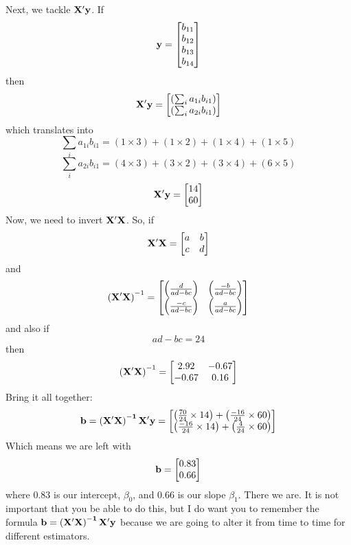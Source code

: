 Next, we tackle ${\bf X'y}$. If
\[
{\bf y} =
\begin{bmatrix}
b_{11} \\
b_{12} \\
b_{13} \\
b_{14} \\
\end{bmatrix}
\]
then
\begin{equation}
{\bf X'y} =
\begin{bmatrix}
\left(\sum_ia_{1i}b_{i1}\right) \\
\left(\sum_ia_{2i}b_{i1}\right) \\
\end{bmatrix}
\end{equation}
which translates into
\[
\sum_ia_{1i}b_{i1} = \left(1\times3\right)+\left(1\times2\right)+\left(1\times4\right)+\left(1\times5\right)
\]
\[
\sum_ia_{2i}b_{i1} = \left(4\times3\right)+\left(3\times2\right)+\left(3\times4\right)+\left(6\times5\right)
\]
\[
{\bf X'y} =
\begin{bmatrix}
14 \\
60 \\
\end{bmatrix}
\]
Now, we need to invert $\bf X'X$. So, if
\[
{\bf X'X} =
\begin{bmatrix}
a&b \\
c&d \\
\end{bmatrix}
\]
and
\begin{equation}
\left({\bf X'X}\right)^{-1} =
\begin{bmatrix}
\left(\frac{d}{ad-bc}\right)&\left(\frac{-b}{ad-bc}\right) \\
\left(\frac{-c}{ad-bc}\right)&\left(\frac{a}{ad-bc}\right) \\
\end{bmatrix}
\end{equation}
and also if
\[
ad-bc = 24
\]
then
\[
\left({\bf X'X}\right)^{-1} =
\begin{bmatrix}
2.92&-0.67 \\
-0.67&0.16 \\
\end{bmatrix}
\]
Bring it all together:
\[
{\bf b = \left(X'X\right)^{-1}X'y} =
\begin{bmatrix}
\left(\frac{70}{24}\times14\right)+\left(\frac{-16}{24}\times60\right) \\
\left(\frac{-16}{24}\times14\right)+\left(\frac{4}{24}\times60\right) \\
\end{bmatrix}
\]
Which means we are left with
\[
\bf b =
\begin{bmatrix}
0.83 \\
0.66 \\
\end{bmatrix}
\]
where 0.83 is our intercept, $\beta_0$, and 0.66 is our slope $\beta_1$. There we are. It is not important that you be able to do this, but I do want you to remember the formula $\bf b = \left(X'X\right)^{-1}X'y$ because we are going to alter it from time to time for different estimators.


